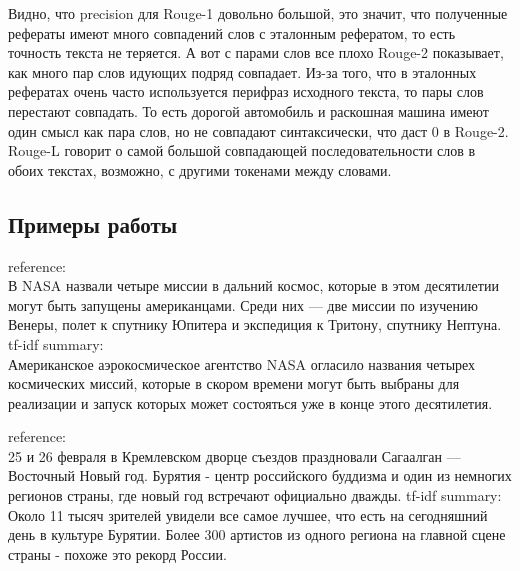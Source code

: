 \documentclass[a4paper]{article}
\begin{document}
    Видно, что precision для Rouge-1 довольно большой, это значит, что полученные рефераты имеют много совпадений слов с эталонным рефератом, то есть точность текста не теряется.
    А вот с парами слов все плохо Rouge-2 показывает, как много пар слов идующих подряд совпадает. Из-за того, что в эталонных рефератах очень часто используется перифраз исходного текста, то пары слов перестают совпадать.
    То есть дорогой автомобиль и раскошная машина имеют один смысл как пара слов, но не совпадают синтаксически, что даст 0 в Rouge-2. Rouge-L говорит о самой большой совпадающей последовательности слов в обоих текстах, возможно, с другими токенами между словами.
    \subsection{Примеры работы}
    \begin{tcolorbox}[title=precision: 0.3929 | recall: 0.3334 | f-measure: 0.3607, fonttitle=\bfseries]
        reference:\\
        В NASA назвали четыре миссии в дальний космос, которые в этом десятилетии могут быть запущены американцами. Среди них — две миссии по изучению Венеры, полет к спутнику Юпитера и экспедиция к Тритону, спутнику Нептуна.
        \tcblower
        tf-idf summary:\\ 
        Американское аэрокосмическое агентство NASA огласило названия четырех космических миссий, которые в скором времени могут быть выбраны для реализации и запуск которых может состояться уже в конце этого десятилетия.
    \end{tcolorbox}

    \begin{tcolorbox}[title=precision: 0.2964 | recall: 0.2701 | f-measure: 0.2821, fonttitle=\bfseries]
        reference:\\
        25 и 26 февраля в Кремлевском дворце съездов праздновали Сагаалган — Восточный Новый год. Бурятия - центр российского буддизма и один из немногих регионов страны, где новый год встречают официально дважды.        
        \tcblower
        tf-idf summary:\\ 
        Около 11 тысяч зрителей увидели все самое лучшее, что есть на сегодняшний день в культуре Бурятии. Более 300 артистов из одного региона на главной сцене страны - похоже это рекорд России.    
    \end{tcolorbox}
\end{document}
